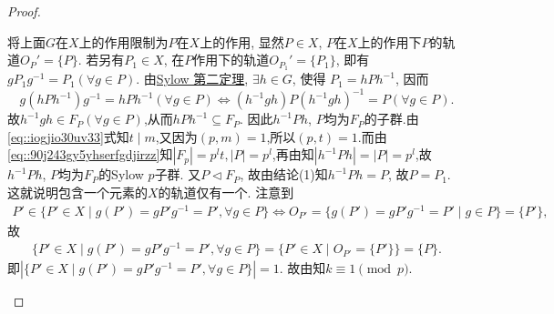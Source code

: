 \documentclass[../../main.tex]{subfiles}%
\begin{document}
\begin{proof}
\begin{enumerate}[(1)]
将上面$G$在$X$上的作用限制为$P$在$X$上的作用, 显然$P\in X$, $P$在$X$上的作用下$P$的轨道$O_P'=\{P\}$. 若另有$P_1\in X$, 在$P$作用下的轨道$O_{P_1}'=\{P_1\}$, 即有$gP_1g^{-1}=P_1(\forall g\in P)$. 由\hyperref[theorem:Sylow 第二定理]{Sylow 第二定理}, $\exists h\in G$, 使得
$P_1=hPh^{-1}$, 因而
$$
g(hPh^{-1})g^{-1}=hPh^{-1}(\forall g\in P) \iff (h^{-1}gh)P(h^{-1}gh)^{-1}=P(\forall g\in P).
$$
故$h^{-1}gh\in F_P(\forall g\in P)$,从而$hPh^{-1}\subseteq F_P$. 因此$h^{-1}Ph$, $P$均为$F_P$的子群.由\eqref{eq::iogjio30uv33}式知$t\mid m$,又因为$(p,m)=1$,所以$(p,t)=1.$而由\eqref{eq::90j243gy5yhserfgdjirzz}知$|F_p|=p^lt,|P|=p^l$,再由知$|h^{-1}Ph|=|P|=p^l$,故$h^{-1}Ph$, $P$均为$F_P$的Sylow $p$子群. 又$P\lhd F_P$, 故由结论(1)知$h^{-1}Ph=P$, 故$P=P_1$. 这就说明包含一个元素的$X$的轨道仅有一个. 注意到
\begin{align*}
P' \in \{ P' \in X \mid g(P') = gP'g^{-1} = P', \forall g \in P \} \iff O_{P'} = \{ g(P') = gP'g^{-1} = P' \mid g \in P \} = \{ P' \},
\end{align*}
故
\begin{align*}
\{ P' \in X \mid g(P') = gP'g^{-1} = P', \forall g \in P \} = \{ P' \in X \mid O_{P'} = \{ P' \} \} = \{ P \}.
\end{align*}
即$| \{ P' \in X \mid g(P') = gP'g^{-1} = P', \forall g \in P \} | = 1.$
故由知$k\equiv 1\pmod{p}$.
\end{enumerate}
\end{proof}
\end{document}
